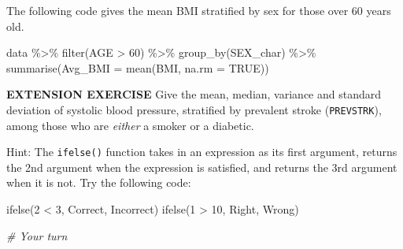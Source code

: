 \documentclass[
]{article}
\newenvironment{Shaded}{\begin{snugshade}}{\end{snugshade}}
\newcommand{\AttributeTok}[1]{\textcolor[rgb]{0.77,0.63,0.00}{#1}}
\newcommand{\CommentTok}[1]{\textcolor[rgb]{0.56,0.35,0.01}{\textit{#1}}}
\newcommand{\ConstantTok}[1]{\textcolor[rgb]{0.00,0.00,0.00}{#1}}
\newcommand{\DecValTok}[1]{\textcolor[rgb]{0.00,0.00,0.81}{#1}}
\newcommand{\FunctionTok}[1]{\textcolor[rgb]{0.00,0.00,0.00}{#1}}
\newcommand{\NormalTok}[1]{#1}
\newcommand{\SpecialCharTok}[1]{\textcolor[rgb]{0.00,0.00,0.00}{#1}}
\newcommand{\StringTok}[1]{\textcolor[rgb]{0.31,0.60,0.02}{#1}}
\begin{document}
The following code gives the mean BMI stratified by sex for those over
60 years old.

\begin{Shaded}
\begin{Highlighting}[]
\NormalTok{data }\SpecialCharTok{\%\textgreater{}\%}
     \FunctionTok{filter}\NormalTok{(AGE }\SpecialCharTok{\textgreater{}} \DecValTok{60}\NormalTok{) }\SpecialCharTok{\%\textgreater{}\%}
     \FunctionTok{group\_by}\NormalTok{(SEX\_char) }\SpecialCharTok{\%\textgreater{}\%}
     \FunctionTok{summarise}\NormalTok{(}\AttributeTok{Avg\_BMI =} \FunctionTok{mean}\NormalTok{(BMI, }\AttributeTok{na.rm =} \ConstantTok{TRUE}\NormalTok{))}
\end{Highlighting}
\end{Shaded}

\textbf{EXTENSION EXERCISE} Give the mean, median, variance and standard
deviation of systolic blood pressure, stratified by prevalent stroke
(\texttt{PREVSTRK}), among those who are \emph{either} a smoker or a
diabetic.

Hint: The \texttt{ifelse()} function takes in an expression as its first
argument, returns the 2nd argument when the expression is satisfied, and
returns the 3rd argument when it is not. Try the following code:

\begin{Shaded}
\begin{Highlighting}[]
\FunctionTok{ifelse}\NormalTok{(}\DecValTok{2} \SpecialCharTok{\textless{}} \DecValTok{3}\NormalTok{, }\StringTok{\textquotesingle{}Correct\textquotesingle{}}\NormalTok{, }\StringTok{\textquotesingle{}Incorrect\textquotesingle{}}\NormalTok{)}
\FunctionTok{ifelse}\NormalTok{(}\DecValTok{1} \SpecialCharTok{\textgreater{}} \DecValTok{10}\NormalTok{, }\StringTok{\textquotesingle{}Right\textquotesingle{}}\NormalTok{, }\StringTok{\textquotesingle{}Wrong\textquotesingle{}}\NormalTok{)}
\end{Highlighting}
\end{Shaded}

\begin{Shaded}
\begin{Highlighting}[]
\CommentTok{\# Your turn}
\end{Highlighting}
\end{Shaded}
\end{document}
